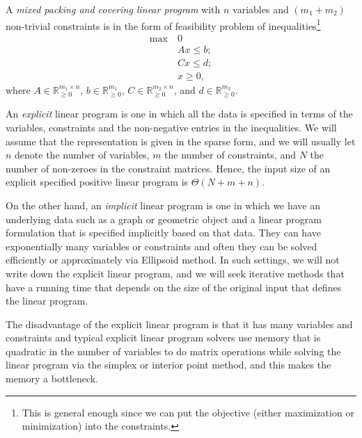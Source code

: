 \begin{definition}\label{def:mixed-packing-covering-LP}
	A \emph{mixed packing and covering linear program} with \(n\) variables and \((m_1 + m_2)\) non-trivial constraints is in the form of feasibility problem of inequalities\footnote{This is general enough since we can put the objective (either maximization or minimization) into the constraints.}
	\[
		\begin{aligned}
			\max~ & 0           \\
			      & Ax \leq b ; \\
			      & Cx \leq d ; \\
			      & x \geq 0,
		\end{aligned}
	\]
	where \(A \in \mathbb{R} _{\geq 0}^{m_1 \times n}\), \(b \in \mathbb{R} _{\geq 0}^{m_1}\), \(C \in \mathbb{R} _{\geq 0}^{m_2 \times n}\), and \(d \in \mathbb{R} _{\geq 0}^{m_2}\).
\end{definition}

An \emph{explicit} linear program is one in which all the data is specified in terms of the variables, constraints and the non-negative entries in the inequalities. We will assume that the representation is given in the sparse form, and we will usually let \(n\) denote the number of variables, \(m\) the number of constraints, and \(N\) the number of non-zeroes in the constraint matrices. Hence, the input size of an explicit specified positive linear program is \(\Theta (N + m + n)\).

On the other hand, an \emph{implicit} linear program is one in which we have an underlying data such as a graph or geometric object and a linear program formulation that is specified implicitly based on that data. They can have exponentially many variables or constraints and often they can be solved efficiently or approximately via Ellipsoid method. In such settings, we will not write down the explicit linear program, and we will seek iterative methods that have a running time that depends on the size of the original input that defines the linear program.

\begin{note}
	The disadvantage of the explicit linear program is that it has many variables and constraints and typical explicit linear program solvers use memory that is quadratic in the number of variables to do matrix operations while solving the linear program via the simplex or interior point method, and this makes the memory a bottleneck.
\end{note}


